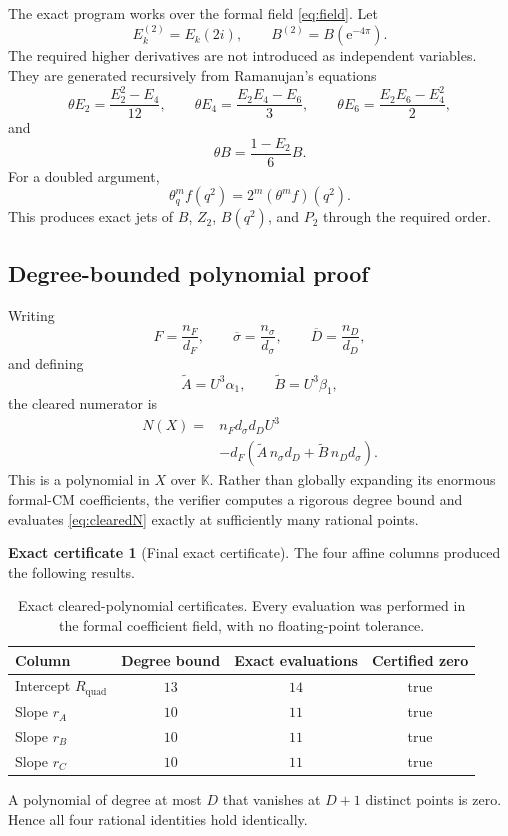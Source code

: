 \documentclass[11pt]{article}
\theoremstyle{definition}
\newtheorem{certificate}[theorem]{Exact certificate}
\theoremstyle{remark}
\newcommand{\e}{\mathrm{e}}
\newcommand{\Kfield}{\mathbb{K}}
\newcommand{\bsigma}{\overline{\sigma}}
\newcommand{\bD}{\overline{D}}
\begin{document}
The exact program works over the formal field \eqref{eq:field}.  Let
\[
 E_k^{(2)}=E_k(2i),
 \qquad
 B^{(2)}=B(\e^{-4\pi}).
\]
The required higher derivatives are not introduced as independent variables.  They are generated recursively from Ramanujan's equations
\begin{equation}\label{eq:Ramanujan}
 \theta E_2=\frac{E_2^2-E_4}{12},
 \qquad
 \theta E_4=\frac{E_2E_4-E_6}{3},
 \qquad
 \theta E_6=\frac{E_2E_6-E_4^2}{2},
\end{equation}
and
\begin{equation}\label{eq:Bderiv}
 \theta B=\frac{1-E_2}{6}B.
\end{equation}
For a doubled argument,
\begin{equation}\label{eq:doublejet}
 \theta_q^m f(q^2)=2^m(\theta^mf)(q^2).
\end{equation}
This produces exact jets of $B$, $Z_2$, $B(q^2)$, and $P_2$ through the required order.

\subsection{Degree-bounded polynomial proof}

Writing
\[
 F=\frac{n_F}{d_F},
 \qquad
 \bsigma=\frac{n_\sigma}{d_\sigma},
 \qquad
 \bD=\frac{n_D}{d_D},
\]
and defining
\[
 \widetilde A=U^3\alpha_1,
 \qquad
 \widetilde B=U^3\beta_1,
\]
the cleared numerator is
\begin{equation}\label{eq:clearedN}
 \begin{aligned}
 N(X)={}&n_Fd_\sigma d_DU^3\\
 &-d_F\left(
 \widetilde A\,n_\sigma d_D
 +\widetilde B\,n_Dd_\sigma
 \right).
 \end{aligned}
\end{equation}
This is a polynomial in $X$ over $\Kfield$.  Rather than globally expanding its enormous formal-CM coefficients, the verifier computes a rigorous degree bound and evaluates \eqref{eq:clearedN} exactly at sufficiently many rational points.

\begin{certificate}[Final exact certificate]\label{cert:final}
The four affine columns produced the following results.
\begin{table}[ht]
\centering
\begin{tabular}{lccc}
\toprule
Column & Degree bound & Exact evaluations & Certified zero \\
\midrule
Intercept $R_{\mathrm{quad}}$ & $13$ & $14$ & true \\
Slope $r_A$ & $10$ & $11$ & true \\
Slope $r_B$ & $10$ & $11$ & true \\
Slope $r_C$ & $10$ & $11$ & true \\
\bottomrule
\end{tabular}
\caption{Exact cleared-polynomial certificates.  Every evaluation was performed in the formal coefficient field, with no floating-point tolerance.}
\label{tab:certificate}
\end{table}
A polynomial of degree at most $D$ that vanishes at $D+1$ distinct points is zero.  Hence all four rational identities hold identically.
\end{certificate}
\end{document}
